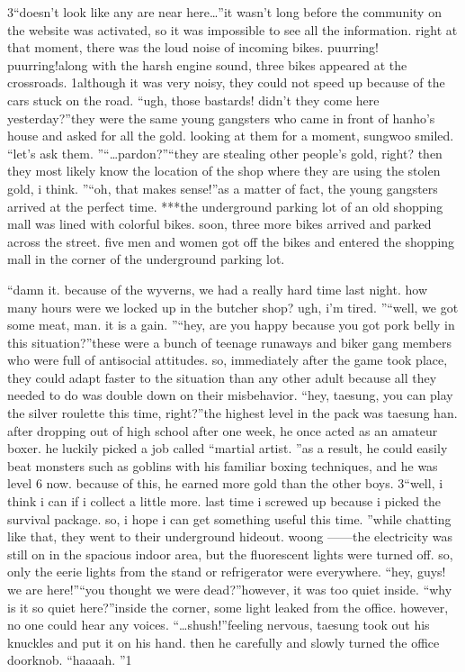 3“doesn’t look like any are near here…”it wasn’t long before the community on the website was activated, so it was impossible to see all the information.
right at that moment, there was the loud noise of incoming bikes.
puurring! puurring!along with the harsh engine sound, three bikes appeared at the crossroads.
1although it was very noisy, they could not speed up because of the cars stuck on the road.
“ugh, those bastards! didn’t they come here yesterday?”they were the same young gangsters who came in front of hanho’s house and asked for all the gold.
 looking at them for a moment, sungwoo smiled.
“let’s ask them.
”“…pardon?”“they are stealing other people’s gold, right? then they most likely know the location of the shop where they are using the stolen gold, i think.
”“oh, that makes sense!”as a matter of fact, the young gangsters arrived at the perfect time.
***the underground parking lot of an old shopping mall was lined with colorful bikes.
soon, three more bikes arrived and parked across the street.
 five men and women got off the bikes and entered the shopping mall in the corner of the underground parking lot.


“damn it.
 because of the wyverns, we had a really hard time last night.
 how many hours were we locked up in the butcher shop? ugh, i’m tired.
”“well, we got some meat, man.
 it is a gain.
”“hey, are you happy because you got pork belly in this situation?”these were a bunch of teenage runaways and biker gang members who were full of antisocial attitudes.
 so, immediately after the game took place, they could adapt faster to the situation than any other adult because all they needed to do was double down on their misbehavior.
“hey, taesung, you can play the silver roulette this time, right?”the highest level in the pack was taesung han.
 after dropping out of high school after one week, he once acted as an amateur boxer.
 he luckily picked a job called “martial artist.
”as a result, he could easily beat monsters such as goblins with his familiar boxing techniques, and he was level 6 now.
 because of this, he earned more gold than the other boys.
3“well, i think i can if i collect a little more.
 last time i screwed up because i picked the survival package.
 so, i hope i can get something useful this time.
”while chatting like that, they went to their underground hideout.
woong ——the electricity was still on in the spacious indoor area, but the fluorescent lights were turned off.
so, only the eerie lights from the stand or refrigerator were everywhere.
“hey, guys! we are here!”“you thought we were dead?”however, it was too quiet inside.
“why is it so quiet here?”inside the corner, some light leaked from the office.
 however, no one could hear any voices.
“…shush!”feeling nervous, taesung took out his knuckles and put it on his hand.
 then he carefully and slowly turned the office doorknob.
“haaaah.
”1

 